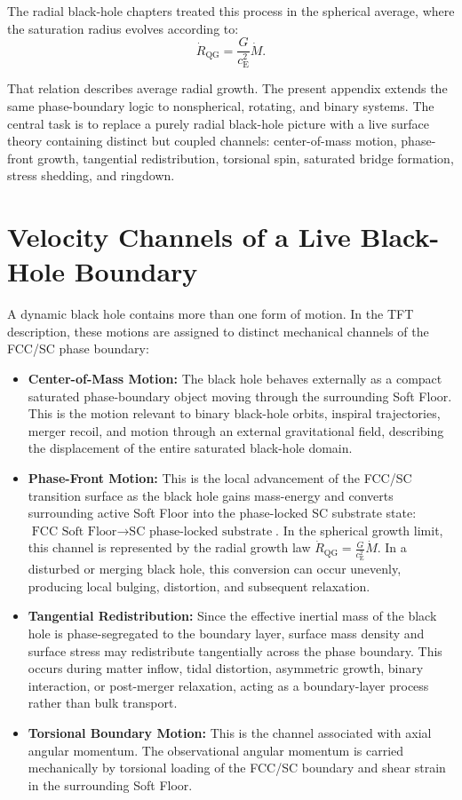 The radial black-hole chapters treated this process in the spherical average, where the saturation radius evolves according to:
\begin{equation}
    \dot{R}_{\mathrm{QG}} = \frac{G}{c_{\mathrm{E}}^2}\dot{M}.
\end{equation}

That relation describes average radial growth. The present appendix extends the same phase-boundary logic to nonspherical, rotating, and binary systems. The central task is to replace a purely radial black-hole picture with a live surface theory containing distinct but coupled channels: center-of-mass motion, phase-front growth, tangential redistribution, torsional spin, saturated bridge formation, stress shedding, and ringdown.

\section{Velocity Channels of a Live Black-Hole Boundary}

A dynamic black hole contains more than one form of motion. In the TFT description, these motions are assigned to distinct mechanical channels of the FCC/SC phase boundary:

\begin{itemize}
    \item \textbf{Center-of-Mass Motion:} The black hole behaves externally as a compact saturated phase-boundary object moving through the surrounding Soft Floor. This is the motion relevant to binary black-hole orbits, inspiral trajectories, merger recoil, and motion through an external gravitational field, describing the displacement of the entire saturated black-hole domain.
    \item \textbf{Phase-Front Motion:} This is the local advancement of the FCC/SC transition surface as the black hole gains mass-energy and converts surrounding active Soft Floor into the phase-locked SC substrate state: 
    $\text{FCC Soft Floor} \rightarrow \text{SC phase-locked substrate}$. 
    In the spherical growth limit, this channel is represented by the radial growth law $\dot{R}_{\mathrm{QG}} = \frac{G}{c_{\mathrm{E}}^2}\dot{M}$. In a disturbed or merging black hole, this conversion can occur unevenly, producing local bulging, distortion, and subsequent relaxation.
    \item \textbf{Tangential Redistribution:} Since the effective inertial mass of the black hole is phase-segregated to the boundary layer, surface mass density and surface stress may redistribute tangentially across the phase boundary. This occurs during matter inflow, tidal distortion, asymmetric growth, binary interaction, or post-merger relaxation, acting as a boundary-layer process rather than bulk transport.
    \item \textbf{Torsional Boundary Motion:} This is the channel associated with axial angular momentum. The observational angular momentum is carried mechanically by torsional loading of the FCC/SC boundary and shear strain in the surrounding Soft Floor.
\end{itemize}

